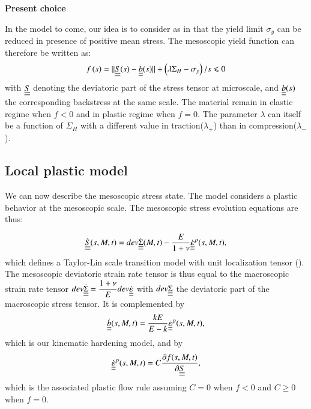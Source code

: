 \documentclass[3p,times,procedia,number]{elsarticle}
\begin{document}
\vspace{6pt}
\textbf{Present choice}
\vspace{6pt}

In the model to come, our idea is to consider as in \cite{Maitournam2011232} that the yield limit $\sigma_y$ can be reduced in presence of positive mean stress. The mesoscopic yield function can therefore be written as:
\begin{equation}
f\left(s\right)=||\uline{\uline{S}}(s)-\uline{\uline{b}}(s)||+\left( \lambda \Sigma_H-\sigma_y\right) /s\leqslant 0
\label{eq.yieldfun}
\end{equation}
with $\uline{\uline{S}}$ denoting the deviatoric part of the stress tensor at microscale, and $\uline{\uline{b}}(s)$ the corresponding backstress at the same scale. The material remain in elastic regime when $f<0$ and in plastic regime when $f=0$. The parameter $\lambda$ can itself be a function of $\Sigma_H$ with a different value in traction($\lambda_+$) than in compression($\lambda_-$).


\subsection{Local plastic model}
We can now describe the mesoscopic stress state.  The model considers a plastic 
behavior at the mesoscopic scale. The mesoscopic stress evolution equations are thus:

\begin{equation}
\dot{\uline{\uline{S}}}(s,M,t)=dev\dot{\uline{\uline{\Sigma}}}(M,t)-\dfrac{E}{1+\nu}\dot{\uline{\uline{\varepsilon}}}^p(s,M,t), 
\label{eq.mesostress}
\end{equation}
which defines a Taylor-Lin scale transition model with unit localization tensor (\cite{Bosia201239}). The mesoscopic deviatoric strain rate tensor is thus equal to the macroscopic strain rate tensor $dev\dot{\uline{\uline{\Sigma}}}=\dfrac{1+\nu}{E}dev\dot{\uline{\uline{\varepsilon}}}$ with $dev\uline{\uline{\Sigma}}$ the deviatoric part of the macroscopic stress tensor. It is complemented by
\begin{equation}
\dot{\uline{\uline{b}}}(s,M,t)=\dfrac{kE}{E-k} \dot{\uline{\uline{\varepsilon}}}^p(s,M,t), 
\label{eq.backstress}
\end{equation}
which is our kinematic hardening model, and by
\begin{equation}
\dot{\uline{\uline{\varepsilon}}}^p(s,M,t)=C\dfrac{\partial f(s,M,t)}{\partial \uline{\uline{S}}}, 
\label{eq.plasticflow}
\end{equation}
which is the associated plastic flow rule assuming $C=0$ when $f<0$ and  $C\geqslant0$ when $f=0$.
\end{document}
